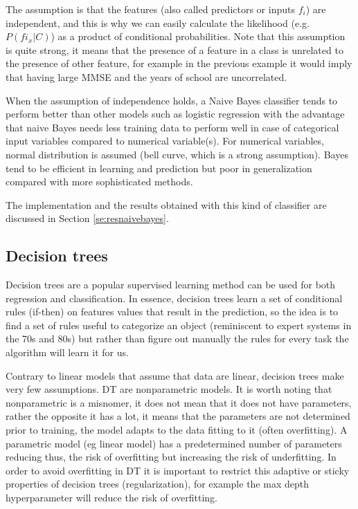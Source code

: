\documentclass[11pt]{article}
\theoremstyle{definition}
\theoremstyle{remark}
\begin{document}
The assumption is that the features (also called predictors or inputs $f_i$) are independent, and this is why we can easily calculate the likelihood (e.g. $P(fi_x|C)$) as a product of conditional probabilities. Note that this assumption is quite strong, it means that the presence of a feature in a class is unrelated to the presence of other feature, for example in the previous example it would imply that having large MMSE and the years of school are uncorrelated.

When the assumption of independence holds, a Naive Bayes classifier tends to perform better than other models such as logistic regression with the advantage that naive Bayes needs less training data to perform well in case of categorical input variables compared to numerical variable(s). For numerical variables, normal distribution is assumed (bell curve, which is a strong assumption).
Bayes tend to be efficient in learning and prediction but poor in generalization compared with more sophisticated methods.

The implementation and the results obtained with this kind of classifier are discussed in Section \ref{se:resnaivebayes}.

\subsection{Decision trees}
\label{sse:dectrees}

Decision trees are a popular supervised learning method can be used for both regression and classification.
In essence, decision trees learn a set of conditional rules (if-then) on features values that result in the prediction, so the idea is to find a set of rules useful to categorize an object (reminiscent to expert systems in the 70s and 80s) but rather than figure out manually the rules for every task the algorithm will learn it for us.

Contrary to linear models that assume that data are linear, decision trees make very few assumptions.
DT are nonparametric models. It is worth noting that nonparametric is a misnomer, it does not mean that it does not have parameters, rather the opposite it has a lot, it means that the parameters are not determined prior to training, the model adapts to the data fitting to it (often overfitting). A parametric model (eg linear model) has a predetermined number of parameters reducing thus, the risk of overfitting but increasing the risk of underfitting. In order to avoid overfitting in DT it is important to restrict this adaptive or sticky properties of decision trees (regularization), for example the max depth hyperparameter will reduce the risk of overfitting.
\end{document}
